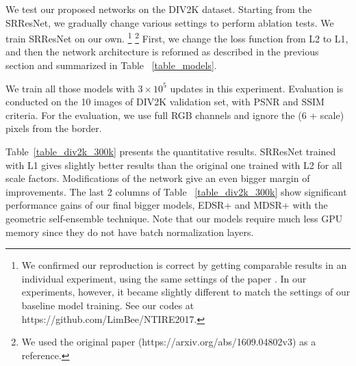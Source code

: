 \documentclass[10pt,twocolumn,letterpaper]{article}
\begin{document}
	We test our proposed networks on the DIV2K dataset. Starting from the SRResNet, we gradually change various settings to perform ablation tests. We train SRResNet \cite{ledig2016photo} on our own. 
	\footnote{We confirmed our reproduction is correct by getting comparable results in an individual experiment, using the same settings of the paper \cite{ledig2016photo}. In our experiments, however, it became slightly different to match the settings of our baseline model training. See our codes at https://github.com/LimBee/NTIRE2017.}
	\footnote{We used the original paper (https://arxiv.org/abs/1609.04802v3) as a reference.}
	First, we change the loss function from L2 to L1, and then the network architecture is reformed as described in the previous section and summarized in Table ~\ref{table_models}.
	
	We train all those models with $3\times10^{5}$ updates in this experiment. 
	Evaluation is conducted on the 10 images of DIV2K validation set, with PSNR and SSIM criteria. For the evaluation, we use full RGB channels and ignore the (6 + scale) pixels from the border.
	
	Table~\ref{table_div2k_300k} presents the quantitative results. SRResNet trained with L1 gives slightly better results than the original one trained with L2 for all scale factors. Modifications of the network give an even bigger margin of improvements. The last 2 columns of Table ~\ref{table_div2k_300k} show significant performance gains of our final bigger models, EDSR+ and MDSR+ with the geometric  self-ensemble technique.
	Note that our models require much less GPU memory since they do not have batch normalization layers.
	
\end{document}
